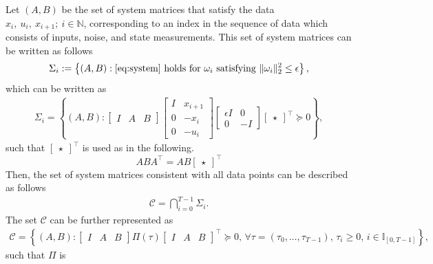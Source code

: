 Let \(\left(A, B\right)\) be the set of system matrices that satisfy the data \(x_i,\ u_i,\ x_{i+1};\ i \in \mathbb{N}\), corresponding to an index in the sequence of data which consists of inputs, noise, and state measurements. This set of system matrices can be written as follows
	\begin{align*}
		\Sigma_i := \left\{ \left( A, B \right) : \eqref{eq:system} \text{ holds for } \omega_i \text{ satisfying } \|\omega_i\|_2^2 \leq \epsilon \right\},
	\end{align*}
which can be written as
	\begin{align*}
		\Sigma_i = \left\{ \left( A, B \right) :
		\begin{bmatrix} I & A & B \end{bmatrix}
		\begin{bmatrix}
			I & x_{i+1} \\
			0 & -x_i \\
			0 & -u_i
		\end{bmatrix}
		\begin{bmatrix}
			\epsilon I & 0 \\
			0 & -I
		\end{bmatrix}
		\begin{bmatrix}
			\star
		\end{bmatrix}^\top \succeq 0
		\right\},
\end{align*}
such that $\begin{bmatrix}	\star \end{bmatrix}^\top$ is used as in the following.
\[
ABA^\top = AB\begin{bmatrix}	\star \end{bmatrix}^\top
\]
Then, the set of system matrices consistent with all data points can be described as follows
	\begin{align*}
		\mathcal{C} = \bigcap_{i=0}^{T-1} \Sigma_i.
	\end{align*}
\noindent
The set $\mathcal{C}$ can be further represented as
	\begin{align*}
		\mathcal{C} = \left\{ \left( A, B \right) :
		\begin{bmatrix} I & A & B \end{bmatrix}
		\Pi(\tau)
		\begin{bmatrix} I & A & B \end{bmatrix}^\top \succeq 0,\,
		\forall \tau = \left(\tau_0, \ldots, \tau_{T-1}\right),\, \tau_i \geq 0,\, i \in \mathbb{I}_{[0,T-1]}
		\right\},
	\end{align*}
such that $\Pi$ is

